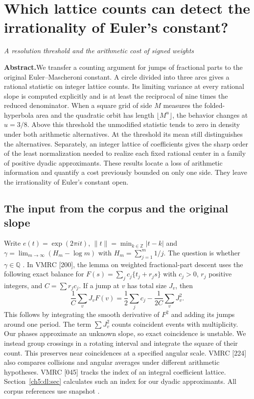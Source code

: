 \documentclass[11pt,a4paper,oneside,openany]{report}
\theoremstyle{remark}\newtheorem{remark}[theorem]{Remark}
\numberwithin{equation}{section}
\begin{document}
\chapter[Lattice counts and resolution]{Which lattice counts can detect the irrationality of Euler's constant?}\label{chap:5}
{\noindent\large\itshape A resolution threshold and the arithmetic cost of signed weights\par}\vspace{9pt}
\noindent\textbf{Abstract.}\enspace We transfer a counting argument for jumps of fractional parts to the original Euler--Mascheroni constant. A circle divided into three arcs gives a rational statistic on integer lattice counts. Its limiting variance at every rational slope is computed explicitly and is at least the reciprocal of nine times the reduced denominator. When a square grid of side $M$ measures the folded-hyperbola area and the quadratic orbit has length $\lfloor M^u\rfloor$, the behavior changes at $u=3/8$. Above this threshold the unmodified statistic tends to zero in density under both arithmetic alternatives. At the threshold its mean still distinguishes the alternatives. Separately, an integer lattice of coefficients gives the sharp order of the least normalization needed to realize each fixed rational center in a family of positive dyadic approximants. These results locate a loss of arithmetic information and quantify a cost previously bounded on only one side. They leave the irrationality of Euler's constant open.

\section{The input from the corpus and the original slope}
Write $e(t)=\exp(2\pi i t)$, $\|t\|=\min_{k\in\mathbb Z}|t-k|$ and
$\gamma=\lim_{m\to\infty}(H_m-\log m)$ with $H_m=\sum_{j=1}^m1/j$. The question is whether $\gamma\in\mathbb Q$ \cite{lagarias,brent,sondow}. In VMRC [200], the lemma on weighted fractional-part descent uses the following exact balance for $F(s)=\sum_j c_j\{t_j+r_js\}$ with $c_j>0$, $r_j$ positive integers, and $C=\sum r_jc_j$. If a jump at $v$ has total size $J_v$, then
\[
 \frac1C\sum_v J_vF(v)=\frac12\sum_j c_j-\frac1{2C}\sum_v J_v^2.
\]
This follows by integrating the smooth derivative of $F^2$ and adding its jumps around one period. The term $\sum J_v^2$ counts coincident events with multiplicity. Our phases approximate an unknown slope, so exact coincidence is unstable. We instead group crossings in a rotating interval and integrate the square of their count. This preserves near coincidences at a specified angular scale. VMRC [224] also compares collisions and angular averages under different arithmetic hypotheses. VMRC [045] tracks the index of an integral coefficient lattice. Section~\ref{ch5:dl:sec} calculates such an index for our dyadic approximants. All corpus references use snapshot \cite{corpus}.
\end{document}
